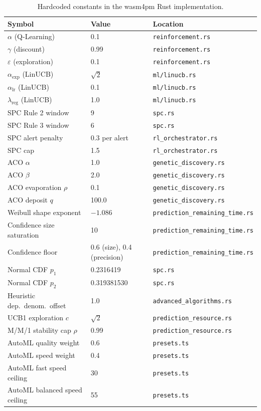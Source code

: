 \documentclass[11pt,a4paper]{article}
\begin{document}
\begin{table}[h!]
\centering
\begin{tabular}{lll}
\toprule
Symbol & Value & Location \\
\midrule
$\alpha$ (Q-Learning) & 0.1 & \texttt{reinforcement.rs} \\
$\gamma$ (discount) & 0.99 & \texttt{reinforcement.rs} \\
$\varepsilon$ (exploration) & 0.1 & \texttt{reinforcement.rs} \\
$\alpha_\text{exp}$ (LinUCB) & $\sqrt{2}$ & \texttt{ml/linucb.rs} \\
$\alpha_\text{lr}$ (LinUCB) & 0.1 & \texttt{ml/linucb.rs} \\
$\lambda_\text{reg}$ (LinUCB) & 1.0 & \texttt{ml/linucb.rs} \\
SPC Rule 2 window & 9 & \texttt{spc.rs} \\
SPC Rule 3 window & 6 & \texttt{spc.rs} \\
SPC alert penalty & 0.3 per alert & \texttt{rl\_orchestrator.rs} \\
SPC cap & 1.5 & \texttt{rl\_orchestrator.rs} \\
ACO $\alpha$ & 1.0 & \texttt{genetic\_discovery.rs} \\
ACO $\beta$ & 2.0 & \texttt{genetic\_discovery.rs} \\
ACO evaporation $\rho$ & 0.1 & \texttt{genetic\_discovery.rs} \\
ACO deposit $q$ & 100.0 & \texttt{genetic\_discovery.rs} \\
Weibull shape exponent & $-1.086$ & \texttt{prediction\_remaining\_time.rs} \\
Confidence size saturation & 10 & \texttt{prediction\_remaining\_time.rs} \\
Confidence floor & 0.6 (size), 0.4 (precision) & \texttt{prediction\_remaining\_time.rs} \\
Normal CDF $p_1$ & 0.2316419 & \texttt{spc.rs} \\
Normal CDF $p_2$ & 0.319381530 & \texttt{spc.rs} \\
Heuristic dep.\ denom.\ offset & 1.0 & \texttt{advanced\_algorithms.rs} \\
UCB1 exploration $c$ & $\sqrt{2}$ & \texttt{prediction\_resource.rs} \\
M/M/1 stability cap $\rho$ & 0.99 & \texttt{prediction\_resource.rs} \\
AutoML quality weight & 0.6 & \texttt{presets.ts} \\
AutoML speed weight & 0.4 & \texttt{presets.ts} \\
AutoML fast speed ceiling & 30 & \texttt{presets.ts} \\
AutoML balanced speed ceiling & 55 & \texttt{presets.ts} \\
\bottomrule
\end{tabular}
\caption{Hardcoded constants in the wasm4pm Rust implementation.}
\end{table}
\end{document}
